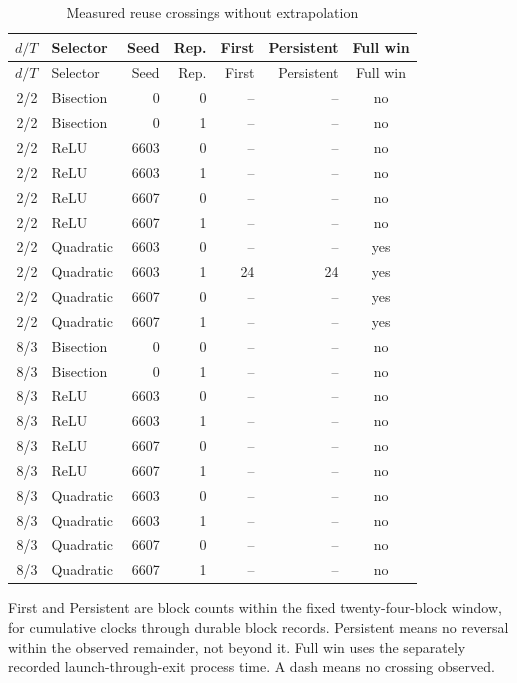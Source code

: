 \begingroup\small\setlength{\tabcolsep}{4pt}
\begin{longtable}{rlrrrrc}
\caption{Measured reuse crossings without extrapolation}\label{tab:crossings67}\\
\toprule
$d/T$ & Selector & Seed & Rep. & First & Persistent & Full win \\
\midrule
\endfirsthead
$d/T$ & Selector & Seed & Rep. & First & Persistent & Full win \\
\midrule
\endhead
2/2 & Bisection & 0 & 0 & -- & -- & no \\
2/2 & Bisection & 0 & 1 & -- & -- & no \\
2/2 & ReLU & 6603 & 0 & -- & -- & no \\
2/2 & ReLU & 6603 & 1 & -- & -- & no \\
2/2 & ReLU & 6607 & 0 & -- & -- & no \\
2/2 & ReLU & 6607 & 1 & -- & -- & no \\
2/2 & Quadratic & 6603 & 0 & -- & -- & yes \\
2/2 & Quadratic & 6603 & 1 & 24 & 24 & yes \\
2/2 & Quadratic & 6607 & 0 & -- & -- & yes \\
2/2 & Quadratic & 6607 & 1 & -- & -- & yes \\
8/3 & Bisection & 0 & 0 & -- & -- & no \\
8/3 & Bisection & 0 & 1 & -- & -- & no \\
8/3 & ReLU & 6603 & 0 & -- & -- & no \\
8/3 & ReLU & 6603 & 1 & -- & -- & no \\
8/3 & ReLU & 6607 & 0 & -- & -- & no \\
8/3 & ReLU & 6607 & 1 & -- & -- & no \\
8/3 & Quadratic & 6603 & 0 & -- & -- & no \\
8/3 & Quadratic & 6603 & 1 & -- & -- & no \\
8/3 & Quadratic & 6607 & 0 & -- & -- & no \\
8/3 & Quadratic & 6607 & 1 & -- & -- & no \\
\bottomrule
\end{longtable}
\endgroup
\noindent First and Persistent are block counts within the fixed twenty-four-block window, for cumulative clocks through durable block records. Persistent means no reversal within the observed remainder, not beyond it. Full win uses the separately recorded launch-through-exit process time. A dash means no crossing observed.
